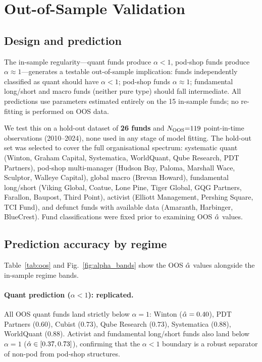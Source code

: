 
\FloatBarrier

\section{\label{sec:oos}Out-of-Sample Validation}

\subsection{Design and prediction}

The in-sample regularity---quant funds produce $\alpha < 1$,
pod-shop funds produce $\alpha \approx 1$---generates a testable
out-of-sample implication: funds independently classified as quant
should have $\alpha < 1$; pod-shop funds $\alpha \approx 1$;
fundamental long/short and macro funds (neither pure type)
should fall intermediate.
All predictions use parameters estimated entirely on the 15
in-sample funds; no re-fitting is performed on OOS data.

We test this on a hold-out dataset of \textbf{26 funds} and
$N_{\rm OOS}{=}119$ point-in-time observations (2010--2024),
none used in any stage of model fitting.
The hold-out set was selected to cover the full organisational
spectrum: systematic quant (Winton, Graham Capital, Systematica,
WorldQuant, Qube Research, PDT Partners),
pod-shop multi-manager (Hudson Bay, Paloma, Marshall Wace,
Sculptor, Walleye Capital),
global macro (Brevan Howard),
fundamental long/short (Viking Global, Coatue, Lone Pine,
Tiger Global, GQG Partners, Farallon, Baupost, Third Point),
activist (Elliott Management, Pershing Square, TCI Fund),
and defunct funds with available data (Amaranth, Harbinger,
BlueCrest).
Fund classifications were fixed prior to examining OOS $\hat{\alpha}$ values.

\subsection{Prediction accuracy by regime}

Table~\ref{tab:oos} and Fig.~\ref{fig:alpha_bands} show the
OOS $\hat{\alpha}$ values alongside the in-sample regime bands.

\paragraph{Quant prediction ($\alpha < 1$): replicated.}
All OOS quant funds land strictly below $\alpha = 1$:
Winton ($\hat{\alpha} = 0.40$), PDT Partners ($0.60$), Cubist ($0.73$),
Qube Research ($0.73$), Systematica ($0.88$), WorldQuant ($0.88$).
Activist and fundamental long/short funds also land below $\alpha = 1$
($\hat{\alpha} \in [0.37, 0.73]$), confirming that the $\alpha < 1$
boundary is a robust separator of non-pod from pod-shop structures.

